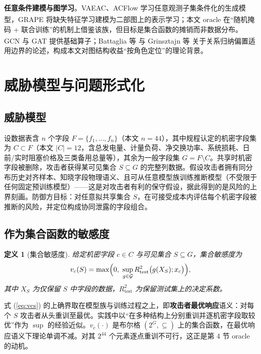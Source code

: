\documentclass[10.5pt,compsoc,UTF8]{CjC}
\theoremstyle{mystyle}
\newtheorem{definition}{定义}
\newcommand{\upcite}[1]{\textsuperscript{\cite{#1}}}
\begin{document}
\textbf{任意条件建模与图学习}。VAEAC\upcite{ivanov2019vaeac}、ACFlow\upcite{li2020acflow} 学习任意观测子集条件化的生成模型，GRAPE\upcite{you2020grape} 将缺失特征学习建模为二部图上的表示学习；本文 oracle 在“随机掩码 + 联合训练”的机制上借鉴该族，但目标是集合函数的摊销而非数据分布。GCN\upcite{kipf2017gcn} 与 GAT\upcite{velickovic2018gat} 提供基础算子；Battaglia 等\upcite{battaglia2018relational} 与 Grinsztajn 等\upcite{grinsztajn2022tabular} 关于关系归纳偏置适用边界的论述，构成本文对图结构收益“按角色定位”的理论背景。

\section{\heiti 威胁模型与问题形式化}

\subsection{威胁模型}

设数据表含 $n$ 个字段 $F=\{f_1,\dots,f_n\}$（本文 $n=44$），其中规程认定的机密字段集为 $C\subset F$（本文 $|C|=12$，含总发电量、计量负荷、净交换功率、系统损耗、日前/实时阻塞价格及三类备用总量等），其余为一般字段集 $G=F\setminus C$。共享时机密字段被删除，攻击者获得某可见集合 $S\subseteq G$ 的完整列数据。假设攻击者拥有同分布历史对齐样本、知晓字段物理语义、且可从任意模型族训练推断模型（不受限于任何固定预训练模型）——这是对攻击者有利的保守假设，据此得到的是风险的上界刻画。防御方目标：对任意拟共享集合 $S$，在可接受成本内评估每个机密字段被推断的风险，并定位构成协同泄露的字段组合。

\subsection{作为集合函数的敏感度}

\begin{definition}[集合敏感度]
给定机密字段 $c\in C$ 与可见集合 $S\subseteq G$，集合敏感度为
\begin{equation}
v_c(S)=\max\Bigl(0,\ \sup_{g\in\mathcal{G}} R^2_{\mathrm{test}}\bigl(g(X_S);x_c\bigr)\Bigr),
\label{eq:vcs}
\end{equation}
其中 $X_S$ 为仅保留 $S$ 中字段的数据，$R^2_{\mathrm{test}}$ 为保留测试集上的决定系数。
\end{definition}

式 (\ref{eq:vcs}) 的上确界取在模型族与训练过程之上，即\textbf{攻击者最优响应}语义：对每个 $S$ 攻击者从头重训至最优。实践中以“在多种结构上分别重训并逐机密字段取较优”作为 $\sup$ 的经验近似。$v_c(\cdot)$ 是布尔格 $(2^{G},\subseteq)$ 上的集合函数，在最优响应语义下理论单调不减。对其 $2^{44}$ 个元素逐点重训不可行，这正是第 4 节 oracle 的动机。
\end{document}

